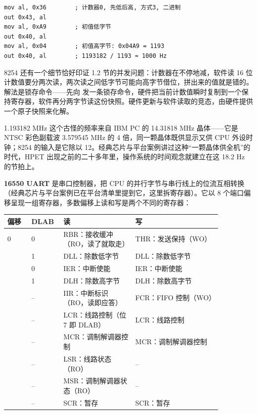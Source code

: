 \begin{lstlisting}
mov al, 0x36        ; 计数器0, 先低后高, 方式3, 二进制
out 0x43, al
mov al, 0xA9        ; 初值低字节
out 0x40, al
mov al, 0x04        ; 初值高字节: 0x04A9 = 1193
out 0x40, al        ; 1193182 / 1193 ≈ 1000 Hz
\end{lstlisting}

8254 还有一个细节恰好印证 1.2 节的并发问题：计数器在不停地减，软件读 16 位计数值要分两次读，两次读之间低字节可能向高字节借位，拼出来的值就是错的。解法是锁存命令——先向  发一条锁存命令，硬件把当前计数值瞬时复制到一个保持寄存器，软件再分两字节读这份快照。硬件更新与软件读取的竞态，由硬件提供一个原子快照来化解。

\begin{classicnote}
1.193182 MHz 这个古怪的频率来自 IBM PC 的 14.31818 MHz 晶体——它是 NTSC 彩色副载波 3.579545 MHz 的 4 倍，同一颗晶体既供显示又供 CPU 外设时钟；8254 的输入是它除以 12。经典芯片与平台案例讲过这种“一颗晶体供全机”的时代，HPET 出现之前的二十多年里，操作系统的时间观念就建立在这 18.2 Hz 的节拍上。
\end{classicnote}

\textbf{16550 UART} 是串口控制器，把 CPU 的并行字节与串行线上的位流互相转换（经典芯片与平台案例已在平台清单里提到它，这里拆寄存器）。它以 8 个端口偏移呈现一组寄存器，多数偏移上读和写是两个不同的寄存器：

\begin{longtable}{L{0.10\linewidth}L{0.10\linewidth}L{0.30\linewidth}L{0.36\linewidth}}
\toprule
偏移 & DLAB & 读 & 写 \\
 & 0 & RBR：接收缓冲（RO，读了就取走） & THR：发送保持（WO） \\ & 1 & DLL：除数低字节 & DLL：除数低字节 \\ & 0 & IER：中断使能 & IER：中断使能 \\ & 1 & DLH：除数高字节 & DLH：除数高字节 \\ & -- & IIR：中断标识（RO，读即应答） & FCR：FIFO 控制（WO） \\ & -- & LCR：线路控制（位 7 即 DLAB） & LCR：线路控制 \\ & -- & MCR：调制解调器控制 & MCR：调制解调器控制 \\ & -- & LSR：线路状态（RO） & -- \\ & -- & MSR：调制解调器状态（RO） & -- \\ & -- & SCR：暂存 & SCR：暂存 \\
\bottomrule
\end{longtable}

